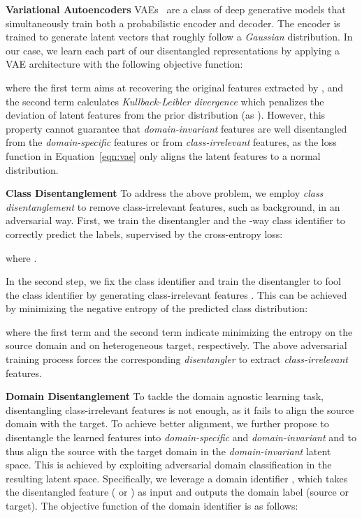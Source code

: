 \documentclass{article}
\begin{document}
\textbf{Variational Autoencoders} VAEs~\cite{vae} are a class of deep generative models that simultaneously train both a probabilistic encoder and decoder. The encoder is trained to generate latent vectors that roughly follow a \textit{Gaussian} distribution. 
In our case, we learn each part of our disentangled representations by applying a VAE architecture with the following objective function:

where the first term aims at recovering the original features extracted by , and the second term calculates \textit{Kullback-Leibler divergence} which penalizes the deviation of latent features from the prior distribution  (as ). However, this property cannot guarantee that \textit{domain-invariant} features are well disentangled from the \textit{domain-specific} features or from \textit{class-irrelevant} features, as the loss function in Equation~\ref{eqn:vae} only aligns the latent features to a normal distribution. 


\textbf{Class Disentanglement} To address the above problem, we employ \textit{class disentanglement} to remove class-irrelevant features, such as background, in an adversarial way.
First, we train the disentangler  and the -way class identifier  to correctly predict the labels, supervised by the cross-entropy loss:

where .




In the second step, we fix the class identifier and train the disentangler  to fool the class identifier by generating class-irrelevant features . This can be achieved by minimizing the negative entropy of the 
predicted class distribution:

where the first term and the second term indicate minimizing the entropy on the source domain and on heterogeneous target, respectively. 
The above adversarial training process forces the corresponding \textit{disentangler} to extract \textit{class-irrelevant} features. 


\textbf{Domain Disentanglement} To tackle the domain agnostic learning task, 
disentangling class-irrelevant features is not enough, as it fails to align the source domain with the target. To achieve better alignment, we further propose 
to disentangle the learned features into \textit{domain-specific} and \textit{domain-invariant} and to thus align the source with the target domain in the \textit{domain-invariant} latent space. This is achieved by exploiting adversarial domain classification in the resulting latent space. Specifically, we leverage a domain identifier , which takes the disentangled feature ( or  ) as input and outputs the domain label  (source or target). The objective function of the domain identifier is as follows:
\end{document}
